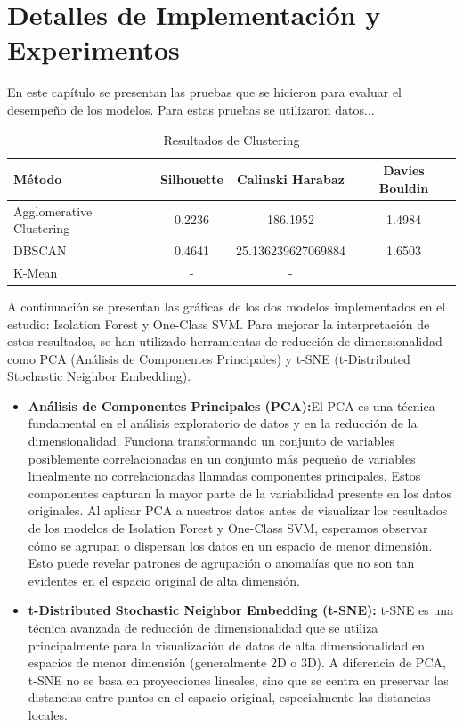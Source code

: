 \chapter{Detalles de Implementación y Experimentos}\label{chapter:implementation}

En este capítulo se presentan las pruebas que se hicieron para evaluar
 el desempeño de los modelos. Para estas pruebas se utilizaron datos...

\begin{table}[ht]
    \centering
    \caption{Resultados de Clustering}
    \begin{tabular}{lccc}
        \toprule
        \textbf{Método} & \textbf{Silhouette} & \textbf{Calinski Harabaz} & \textbf{Davies Bouldin} \\
        \midrule
        Agglomerative Clustering & 0.2236 & 186.1952 & 1.4984 \\
        DBSCAN & 0.4641 & 25.136239627069884 & 1.6503 \\
        K-Mean & - & - &
        \bottomrule
    \end{tabular}
\end{table}

A continuación se presentan las gráficas de los dos modelos implementados en el estudio: Isolation Forest y One-Class SVM. Para mejorar la interpretación de estos resultados, se han utilizado herramientas de reducción de dimensionalidad como PCA (Análisis de Componentes Principales) y t-SNE (t-Distributed Stochastic Neighbor Embedding).\\

\begin{itemize}
	\item {\textbf{Análisis de Componentes Principales (PCA):}}El PCA es una técnica fundamental en el análisis exploratorio de datos y en la reducción de la dimensionalidad. Funciona transformando un conjunto de variables posiblemente correlacionadas en un conjunto más pequeño de variables linealmente no correlacionadas llamadas componentes principales. Estos componentes capturan la mayor parte de la variabilidad presente en los datos originales. Al aplicar PCA a nuestros datos antes de visualizar los resultados de los modelos de Isolation Forest y One-Class SVM, esperamos observar cómo se agrupan o dispersan los datos en un espacio de menor dimensión. Esto puede revelar patrones de agrupación o anomalías que no son tan evidentes en el espacio original de alta dimensión.
	
	\item {\textbf{t-Distributed Stochastic Neighbor Embedding (t-SNE):}} 
t-SNE es una técnica avanzada de reducción de dimensionalidad que se utiliza principalmente para la visualización de datos de alta dimensionalidad en espacios de menor dimensión (generalmente 2D o 3D). A diferencia de PCA, t-SNE no se basa en proyecciones lineales, sino que se centra en preservar las distancias entre puntos en el espacio original, especialmente las distancias locales.
\end{itemize}


